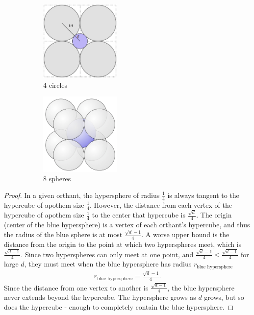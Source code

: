 \documentclass{article} %
\theoremstyle{plain}
\numberwithin{equation}{section} %
\numberwithin{figure}{section} %
\numberwithin{table}{section} %
\begin{document}
\begin{figure}[ht!]
\centering
\begin{subfigure}{.5\textwidth}
    \centering
    \includegraphics[width=40mm]{figures/4circles1}
    \caption{4 circles}
    \label{fig1}
\end{subfigure}%
\begin{subfigure}{.5\textwidth}
    \centering
    \includegraphics[width=40mm]{figures/8spheres}
    \caption{8 spheres}
    \label{fig2}
\end{subfigure}
\caption{}
\label{fig:test}
\end{figure}

\begin{proof}
    In a given orthant, the hypersphere of radius $\frac{1}{4}$ is always tangent to the hypercube of apothem size $\frac{1}{4}$.  However, the distance from each vertex of the hypercube of apothem size $\frac{1}{4}$ to the center that hypercube is $\frac{\sqrt{d}}{4}$.  The origin (center of the blue hypersphere) is a vertex of each orthant's hypercube, and thus the radius of the blue sphere is at most $\frac{\sqrt{d} - 1}{4}$.  A worse upper bound is the distance from the origin to the point at which two hyperspheres meet, which is $\frac{\sqrt{d-1}}{4}$.  Since two hyperspheres can only meet at one point, and $\frac{\sqrt{d} - 1}{4} < \frac{\sqrt{d-1}}{4}$ for large $d$, they must meet when the blue hypersphere has radius $r_{\text{blue hypersphere}}$
    \begin{align*}
        r_{\text{blue hypersphere}} = \frac{\sqrt{d} - 1}{4}.
    \end{align*}
    Since the distance from one vertex to another is $\frac{\sqrt{d-1}}{4}$, the blue hypersphere never extends beyond the hypercube.  The hypersphere grows as $d$ grows, but so does the hypercube - enough to completely contain the blue hypersphere.
\end{proof}
\end{document}
